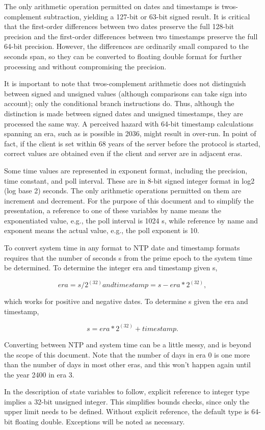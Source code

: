 The only arithmetic operation permitted on dates and timestamps is
twos-complement subtraction, yielding a 127-bit or 63-bit signed
result. It is critical that the first-order differences between two
dates preserve the full 128-bit precision and the first-order
differences between two timestamps preserve the full 64-bit
precision. However, the differences are ordinarily small compared to
the seconds span, so they can be converted to floating double format
for further processing and without compromising the precision.

It is important to note that twos-complement arithmetic does not
distinguish between signed and unsigned values (although comparisons
can take sign into account); only the conditional branch instructions
do. Thus, although the distinction is made between signed dates and
unsigned timestamps, they are processed the same way. A perceived
hazard with 64-bit timestamp calculations spanning an era, such as is
possible in 2036, might result in over-run. In point of fact, if the
client is set within 68 years of the server before the protocol is
started, correct values are obtained even if the client and server
are in adjacent eras.

Some time values are represented in exponent format, including the
precision, time constant, and poll interval. These are in 8-bit
signed integer format in log2 (log base 2) seconds. The only
arithmetic operations permitted on them are increment and decrement.
For the purpose of this document and to simplify the presentation, a
reference to one of these variables by name means the exponentiated
value, e.g., the poll interval is 1024 s, while reference by name and
exponent means the actual value, e.g., the poll exponent is 10.

To convert system time in any format to NTP date and timestamp
formats requires that the number of seconds s from the prime epoch to
the system time be determined. To determine the integer era and
timestamp given s,

$$
era = s / 2^(32) and timestamp = s - era * 2^(32),
$$

which works for positive and negative dates. To determine s given
the era and timestamp,

$$
s = era * 2^(32) + timestamp.
$$

Converting between NTP and system time can be a little messy, and is
beyond the scope of this document. Note that the number of days in
era 0 is one more than the number of days in most other eras, and
this won’t happen again until the year 2400 in era 3.

In the description of state variables to follow, explicit reference
to integer type implies a 32-bit unsigned integer. This simplifies
bounds checks, since only the upper limit needs to be defined.
Without explicit reference, the default type is 64-bit floating
double. Exceptions will be noted as necessary.
